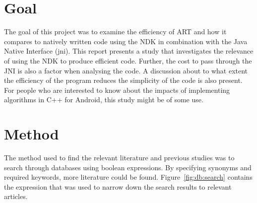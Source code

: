 
\section{Goal}
The goal of this project was to examine the efficiency of ART and how it compares to natively written code using the NDK in combination with the Java Native Interface (\gls{jni}). This report presents a study that investigates the relevance of using the NDK to produce efficient code. Further, the cost to pass through the JNI is also a factor when analysing the code. A discussion about to what extent the efficiency of the program reduces the simplicity of the code is also present. For people who are interested to know about the impacts of implementing algorithms in C++ for Android, this study might be of some use.

\section{Method}

The method used to find the relevant literature and previous studies was to search through databases using boolean expressions. By specifying synonyms and required keywords, more literature could be found. Figure~\ref{fig:db:search} contains the expression that was used to narrow down the search results to relevant articles.%

